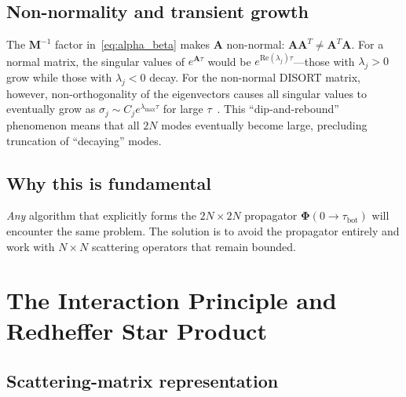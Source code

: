 \documentclass[11pt,a4paper]{article}
\newcommand{\mat}[1]{\mathbf{#1}}
\newcommand{\tbot}{\tau_{\mathrm{bot}}}
\theoremstyle{definition}
\begin{document}
\subsection{Non-normality and transient growth}\label{sec:nonnormal}

The $\mat{M}^{-1}$ factor in~\eqref{eq:alpha_beta} makes $\mat{A}$
non-normal: $\mat{A}\mat{A}^T\neq\mat{A}^T\mat{A}$.
For a normal matrix, the singular values of $e^{\mat{A}\tau}$ would be
$e^{\text{Re}(\lambda_j)\tau}$---those with $\lambda_j>0$ grow while
those with $\lambda_j<0$ decay.  For the non-normal DISORT matrix,
however, non-orthogonality of the eigenvectors causes all singular
values to eventually grow as $\sigma_j\sim C_j e^{\lambda_{\max}\tau}$
for large $\tau$~\cite{kreiss1962}.  This
``dip-and-rebound'' phenomenon means that all $2N$ modes eventually
become large, precluding truncation of ``decaying'' modes.

\subsection{Why this is fundamental}

\emph{Any} algorithm that explicitly forms the $2N\!\times\!2N$
propagator $\mat{\Phi}(0\to\tbot)$ will encounter the same problem.
The solution is to avoid the propagator entirely and work with
$N\!\times\!N$ scattering operators that remain bounded.


\section{The Interaction Principle and Redheffer Star Product}
\label{sec:star_product}

\subsection{Scattering-matrix representation}
\end{document}
